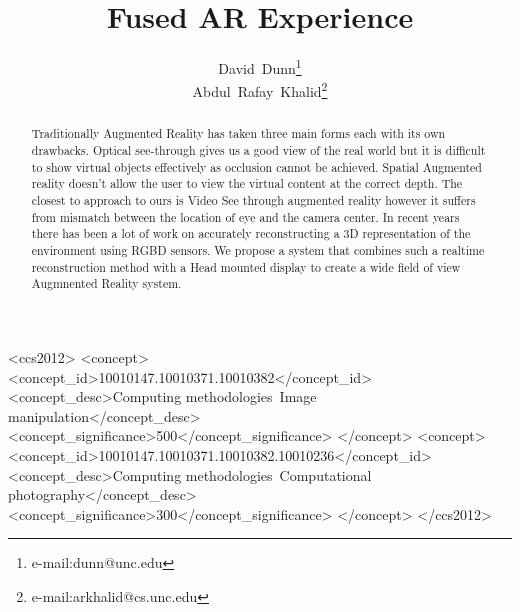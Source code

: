 \documentclass{acmsiggraph}
\title{Fused AR Experience}
\author{David~Dunn\thanks{e-mail:dunn@unc.edu}\\Abdul~Rafay~Khalid\thanks{e-mail:arkhalid@cs.unc.edu}}
\begin{document}


\maketitle

\begin{abstract}
Traditionally Augmented Reality has taken three main forms each with its own drawbacks. Optical see-through gives us a good view of the real world but it is difficult to show virtual objects effectively as occlusion cannot be achieved. Spatial Augmented reality doesn't allow the user to view the virtual content at the correct depth. The closest to approach to ours is Video See through augmented reality however it suffers from mismatch between the location of eye and the camera center. In recent years there has been a lot of work on accurately reconstructing a 3D representation of the environment using RGBD sensors. We propose a system that combines such a realtime reconstruction method with a Head mounted display to create a wide field of view Augmnented Reality system. 

\end{abstract}

%
%
\begin{CCSXML}
<ccs2012>
<concept>
<concept_id>10010147.10010371.10010382</concept_id>
<concept_desc>Computing methodologies~Image manipulation</concept_desc>
<concept_significance>500</concept_significance>
</concept>
<concept>
<concept_id>10010147.10010371.10010382.10010236</concept_id>
<concept_desc>Computing methodologies~Computational photography</concept_desc>
<concept_significance>300</concept_significance>
</concept>
</ccs2012>
\end{CCSXML}
\end{document}

